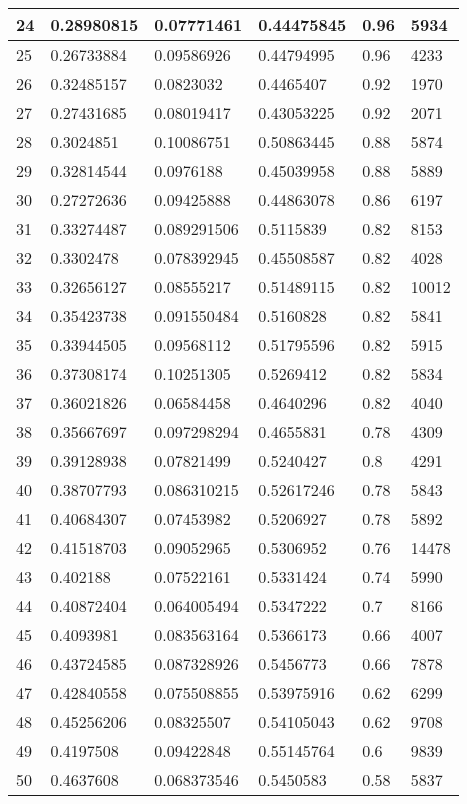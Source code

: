 \begin{longtable}{|l|l|l|l|l|l|}
24 & 0.28980815 & 0.07771461 & 0.44475845 & 0.96 & 5934 \\ \hline 
25 & 0.26733884 & 0.09586926 & 0.44794995 & 0.96 & 4233 \\ \hline 
26 & 0.32485157 & 0.0823032 & 0.4465407 & 0.92 & 1970 \\ \hline 
27 & 0.27431685 & 0.08019417 & 0.43053225 & 0.92 & 2071 \\ \hline 
28 & 0.3024851 & 0.10086751 & 0.50863445 & 0.88 & 5874 \\ \hline 
29 & 0.32814544 & 0.0976188 & 0.45039958 & 0.88 & 5889 \\ \hline 
30 & 0.27272636 & 0.09425888 & 0.44863078 & 0.86 & 6197 \\ \hline 
31 & 0.33274487 & 0.089291506 & 0.5115839 & 0.82 & 8153 \\ \hline 
32 & 0.3302478 & 0.078392945 & 0.45508587 & 0.82 & 4028 \\ \hline 
33 & 0.32656127 & 0.08555217 & 0.51489115 & 0.82 & 10012 \\ \hline 
34 & 0.35423738 & 0.091550484 & 0.5160828 & 0.82 & 5841 \\ \hline 
35 & 0.33944505 & 0.09568112 & 0.51795596 & 0.82 & 5915 \\ \hline 
36 & 0.37308174 & 0.10251305 & 0.5269412 & 0.82 & 5834 \\ \hline 
37 & 0.36021826 & 0.06584458 & 0.4640296 & 0.82 & 4040 \\ \hline 
38 & 0.35667697 & 0.097298294 & 0.4655831 & 0.78 & 4309 \\ \hline 
39 & 0.39128938 & 0.07821499 & 0.5240427 & 0.8 & 4291 \\ \hline 
40 & 0.38707793 & 0.086310215 & 0.52617246 & 0.78 & 5843 \\ \hline 
41 & 0.40684307 & 0.07453982 & 0.5206927 & 0.78 & 5892 \\ \hline 
42 & 0.41518703 & 0.09052965 & 0.5306952 & 0.76 & 14478 \\ \hline 
43 & 0.402188 & 0.07522161 & 0.5331424 & 0.74 & 5990 \\ \hline 
44 & 0.40872404 & 0.064005494 & 0.5347222 & 0.7 & 8166 \\ \hline 
45 & 0.4093981 & 0.083563164 & 0.5366173 & 0.66 & 4007 \\ \hline 
46 & 0.43724585 & 0.087328926 & 0.5456773 & 0.66 & 7878 \\ \hline 
47 & 0.42840558 & 0.075508855 & 0.53975916 & 0.62 & 6299 \\ \hline 
48 & 0.45256206 & 0.08325507 & 0.54105043 & 0.62 & 9708 \\ \hline 
49 & 0.4197508 & 0.09422848 & 0.55145764 & 0.6 & 9839 \\ \hline 
50 & 0.4637608 & 0.068373546 & 0.5450583 & 0.58 & 5837 \\ \hline 
\end{longtable}
